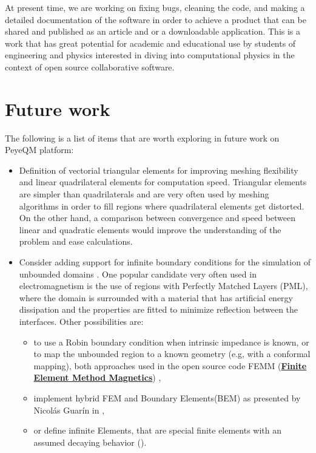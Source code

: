  At present time, we are working on fixing bugs, cleaning the code, and making a detailed documentation of the software in order to achieve a product that can be shared and published as an article and or a downloadable application. This is a work that has great potential for academic and educational use by students of engineering and physics interested in diving into computational physics in the context of open source collaborative software.  
 

\section{Future work}
The following is a list of items that are worth exploring in future work on PeyeQM platform:
\begin{itemize}
%
\item Definition of vectorial triangular elements for improving meshing flexibility and linear quadrilateral elements for computation speed. Triangular elements are simpler than quadrilaterals and are very often used by meshing algorithms in order to fill regions where quadrilateral elements get distorted. On the other hand, a comparison between convergence and speed between linear and quadratic elements would improve the understanding of the problem and ease calculations.
%
\item Consider adding support for infinite boundary conditions for the simulation of unbounded domains \cite{antoine2009review, appelo2003}. One popular candidate very often used in electromagnetism is the use of regions with Perfectly Matched Layers (PML)\cite{Jin2010}, where the domain is surrounded with a material that has artificial energy dissipation and the properties are fitted to minimize reflection between the interfaces. Other possibilities are:
\begin{itemize}
\item to use a Robin boundary condition when intrinsic impedance is known, or to map the unbounded region to a known geometry (e.g, with a conformal mapping), both approaches used in the open source code FEMM (\href{http://www.femm.info/wiki/HomePage}{\textbf{Finite Element Method Magnetics}}) \cite{meeker2010_FEMM},
\item implement hybrid FEM and Boundary Elements(BEM) as presented by Nicol\'as Guar\'in in \cite{Guarin2012},
\item or define infinite Elements, that are special finite elements with an assumed decaying behavior (\cite{Zienkiewicz2005}).
\end{itemize} 

\end{itemize}
